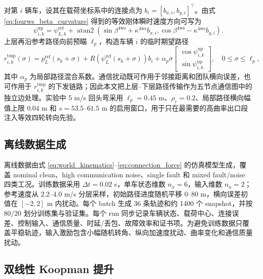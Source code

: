 \documentclass[twocolumn,3p,times,procedia]{elsarticle}
\begin{document}
对第 $i$ 辆车，设其在载荷坐标系中的连接点为 $b_i=[b_{x,i},b_{y,i}]^\top$。由式 \eqref{eq:fourws_beta_curvature} 得到的等效刚体瞬时速度方向可写为
\begin{equation}
\psi_{i,k}^{\mathrm{up}}=
\psi_{L,k}^{\mathrm{ref}}+
\operatorname{atan2}\!\left(
\sin\beta^{\mathrm{4ws}}+\kappa^{\mathrm{4ws}} b_{x,i},
\cos\beta^{\mathrm{4ws}}-\kappa^{\mathrm{4ws}} b_{y,i}
\right).
\label{eq:fourws_vehicle_heading}
\end{equation}
上层再沿参考路径向前预瞄 $\ell_p$，构造车辆 $i$ 的临时期望路径
\begin{equation}
r_{i,k}^{\mathrm{tmp}}(\sigma)=
p_{L}^{\mathrm{ref}}(s_k+\sigma)+
R\!\left(\psi_L^{\mathrm{ref}}(s_k+\sigma)\right)b_i+
\alpha_p \sigma
\begin{bmatrix}
\cos \psi_{i,k}^{\mathrm{up}}\\
\sin \psi_{i,k}^{\mathrm{up}}
\end{bmatrix},
\quad 0\le\sigma\le\ell_p ,
\label{eq:fourws_local_path}
\end{equation}
其中 $\alpha_p$ 为局部路径混合系数。通信扰动既可作用于邻接距离和团队横向误差，也可作用于 $r_{i,k}^{\mathrm{tmp}}$ 的下发链路；因此本文把上层--下层路径传输作为五节点通信图中的独立边处理。实验中 5 m/s 回头弯采用 $\ell_p=0.45$ m、$\rho_r=0.2$、局部路径横向幅值上限 $0.04$ m 和 $s=53.5$--$61.5$ m 的启用窗口，用于只在最需要的高曲率出口段注入等效四轮转向先验。

\subsection{离线数据生成}

离线数据由式 \eqref{eq:world_kinematics}--\eqref{eq:connection_force} 的仿真模型生成，覆盖 nominal clean、high communication noise、single fault 和 mixed fault/noise 四类工况。训练数据采用 $\Delta t=0.02$ s，单车状态维数 $n_x=6$，输入维数 $n_u=2$；参考速度从 $2.2$--$4.0$ m/s 分层采样，初始路径进度随机平移 $0$--$80$ m，横向误差初值在 $[-2,2]$ m 内扰动。每个 batch 生成 36 条轨迹和约 1400 个 snapshot，并按 80/20 划分训练集与验证集。每个 run 同步记录车辆状态、载荷中心、连接误差、控制输入、通信质量、时延/丢包、故障效率和证书项。为避免训练数据只覆盖平稳轨迹，输入激励包含小幅随机转角、纵向加速度扰动、曲率变化和通信质量扰动。

\subsection{双线性 Koopman 提升}
\end{document}
